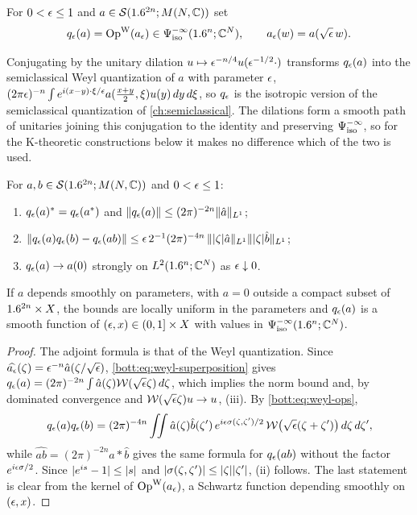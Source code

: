 \begin{definition}\label{bott:def:sl-quantization}
  For $0<\epsilon\le1$ and $a\in\mathcal{S}(1.6^{2n};M(N,\mathbb{C}))$ set
  \begin{equation*}
    q_\epsilon(a)=\operatorname{Op}^{\mathrm{W}}(a_\epsilon)\in\Psi^{-\infty}_{\mathrm{iso}}(1.6^n;\mathbb{C}^N),\qquad a_\epsilon(w)=a(\sqrt{\epsilon}\,w).
  \end{equation*}
\end{definition}

Conjugating by the unitary dilation $u\mapsto\epsilon^{-n/4}u(\epsilon^{-1/2}\cdot)$ transforms
$q_\epsilon(a)$ into the semiclassical Weyl quantization of $a$ with parameter $\epsilon$,
$(2\pi\epsilon)^{-n}\int e^{i(x-y)\cdot\xi/\epsilon}a(\frac{x+y}2,\xi)u(y)\,dy\,d\xi$, so $q_\epsilon$ is
the isotropic version of the semiclassical quantization of \cref{ch:semiclassical}.
The dilations form a smooth path of unitaries joining this conjugation to the identity
and preserving $\Psi^{-\infty}_{\mathrm{iso}}$, so for the K-theoretic constructions below it makes
no difference which of the two is used.

\begin{lemma}\label{bott:lem:sl-product}
  For $a,b\in\mathcal{S}(1.6^{2n};M(N,\mathbb{C}))$ and $0<\epsilon\le1$:
  \begin{enumerate}[label=(\roman*)]
  \item $q_\epsilon(a)^*=q_\epsilon(a^*)$ and $\lVert q_\epsilon(a)\rVert\le(2\pi)^{-2n}\lVert \hat a\rVert_{L^1}$;
  \item $\lVert q_\epsilon(a)q_\epsilon(b)-q_\epsilon(ab)\rVert\le\epsilon\,2^{-1}(2\pi)^{-4n}\,
    \lVert \lvert \zeta\rvert\hat a\rVert_{L^1}\lVert \lvert \zeta\rvert\hat b\rVert_{L^1}$;
  \item $q_\epsilon(a)\to a(0)$ strongly on $L^2(1.6^n;\mathbb{C}^N)$ as $\epsilon\downarrow0$.
  \end{enumerate}
  If $a$ depends smoothly on parameters, with $a=0$ outside a compact subset of
  $1.6^{2n}\times X$, the bounds are locally uniform in the parameters and $q_\epsilon(a)$ is a
  smooth function of $(\epsilon,x)\in(0,1]\times X$ with values in $\Psi^{-\infty}_{\mathrm{iso}}(1.6^n;\mathbb{C}^N)$.
\end{lemma}
\begin{proof}
  The adjoint formula is that of the Weyl quantization. Since
  $\widehat{a_\epsilon}(\zeta)=\epsilon^{-n}\hat a(\zeta/\sqrt{\epsilon})$,
  \eqref{bott:eq:weyl-superposition} gives
  $q_\epsilon(a)=(2\pi)^{-2n}\int\hat a(\zeta)\mathcal W(\sqrt{\epsilon}\zeta)\,d\zeta$, which implies
  the norm bound and, by dominated convergence and $\mathcal W(\sqrt{\epsilon}\zeta)u\to u$, (iii).
  By \eqref{bott:eq:weyl-ops},
  \begin{equation*}
    q_\epsilon(a)q_\epsilon(b)=(2\pi)^{-4n}\iint\hat a(\zeta)\hat b(\zeta')\,
    e^{i\epsilon\sigma(\zeta,\zeta')/2}\,\mathcal W\bigl(\sqrt{\epsilon}(\zeta+\zeta')\bigr)\,d\zeta\,d\zeta',
  \end{equation*}
  while $\widehat{ab}=(2\pi)^{-2n}\hat a*\hat b$ gives the same formula for $q_\epsilon(ab)$
  without the factor $e^{i\epsilon\sigma/2}$. Since $\lvert e^{is}-1\rvert\le\lvert s\rvert$ and
  $\lvert \sigma(\zeta,\zeta')\rvert\le\lvert \zeta\rvert\lvert \zeta'\rvert$, (ii) follows. The last statement is
  clear from the kernel of $\operatorname{Op}^{\mathrm{W}}(a_\epsilon)$, a Schwartz function depending smoothly on
  $(\epsilon,x)$.
\end{proof}

